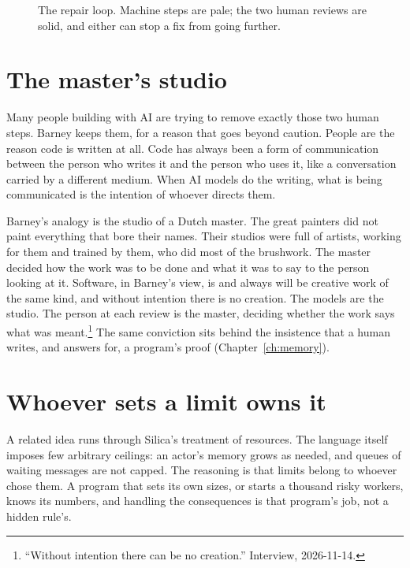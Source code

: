 \begin{figure}[htbp]
  \centering
  
  \caption{The repair loop. Machine steps are pale; the two human reviews are
    solid, and either can stop a fix from going further.}
  \label{fig:repair-loop}
\end{figure}

\section{The master's studio}
\label{sec:studio}

Many people building with AI are trying to remove exactly those two human steps.
Barney keeps them, for a reason that goes beyond caution. People are the reason
code is written at all. Code has always been a form of communication between the
person who writes it and the person who uses it, like a conversation carried by
a different medium. When AI models do the writing, what is being communicated is
the intention of whoever directs them.

Barney's analogy is the studio of a Dutch master. The great painters did not
paint everything that bore their names. Their studios were full of artists,
working for them and trained by them, who did most of the brushwork. The master
decided how the work was to be done and what it was to say to the person looking
at it. Software, in Barney's view, is and always will be creative work of the
same kind, and without intention there is no creation. The models are the
studio. The person at each review is the master, deciding whether the work says
what was meant.\footnote{``Without intention there can be no creation.''
Interview, 2026-11-14.} The same conviction sits behind the insistence that a
human writes, and answers for, a program's proof (Chapter~\ref{ch:memory}).

\section{Whoever sets a limit owns it}

A related idea runs through Silica's treatment of resources. The language
itself imposes few arbitrary ceilings: an actor's memory grows as needed, and
queues of waiting messages are not capped. The reasoning is that limits belong
to whoever chose them. A program that sets its own sizes, or starts a thousand
risky workers, knows its numbers, and handling the consequences is that
program's job, not a hidden rule's.

